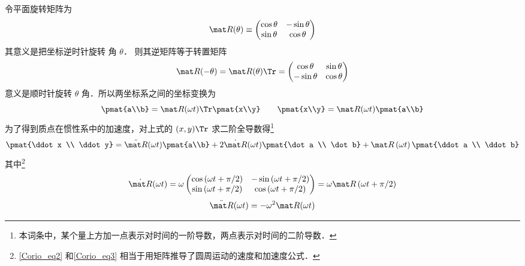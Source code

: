 令平面旋转矩阵为%
\begin{equation}
\mat R(\theta) \equiv \begin{pmatrix}
{\cos \theta }&{ - \sin \theta }\\
{\sin \theta }&{\cos \theta }
\end{pmatrix}
\end{equation}
其意义是把坐标逆时针旋转 角 $\theta$．
则其逆矩阵等于转置矩阵
\begin{equation}
\mat R(- \theta) = \mat R (\theta)\Tr =  \begin{pmatrix}
{\cos \theta }&{\sin \theta }\\
{ - \sin \theta }&{\cos \theta }
\end{pmatrix}
\end{equation}
意义是顺时针旋转 $\theta$ 角．所以两坐标系之间的坐标变换为
\begin{equation}
\pmat{a\\b} = \mat R(\omega t)\Tr \pmat{x\\y}
\qquad
\pmat{x\\y} = \mat R(\omega t) \pmat{a\\b}
\end{equation}
为了得到质点在惯性系中的加速度，对上式的 $(x,y)\Tr$ 求二阶全导数得\footnote{本词条中，某个量上方加一点表示对时间的一阶导数，两点表示对时间的二阶导数．}
\begin{equation}\label{Corio_eq1}
\pmat{\ddot x \\ \ddot y} = 
\ddot{\mat R}(\omega t) \pmat{a\\b} + 2\dot{\mat R} (\omega t) \pmat{\dot a \\ \dot b} + \mat R\left( {\omega t} \right)\pmat{\ddot a \\ \ddot b}
\end{equation}
其中\footnote{\autoref{Corio_eq2} 和\autoref{Corio_eq3} 相当于用矩阵推导了圆周运动的速度和加速度公式．}
\begin{equation}\label{Corio_eq2}
\dot{\mat R}(\omega t) = \omega \begin{pmatrix}
{\cos \left( {\omega t + \pi /2} \right)}&{ - \sin \left( {\omega t + \pi /2} \right)}\\
{\sin \left( {\omega t + \pi /2} \right)}&{\cos \left( {\omega t + \pi /2} \right)}
\end{pmatrix} = \omega \mat R\left( {\omega t + \pi /2} \right)
\end{equation}
\begin{equation}\label{Corio_eq3}
\ddot{\mat R} (\omega t)  =  - {\omega ^2}\mat R (\omega t)
\end{equation}
